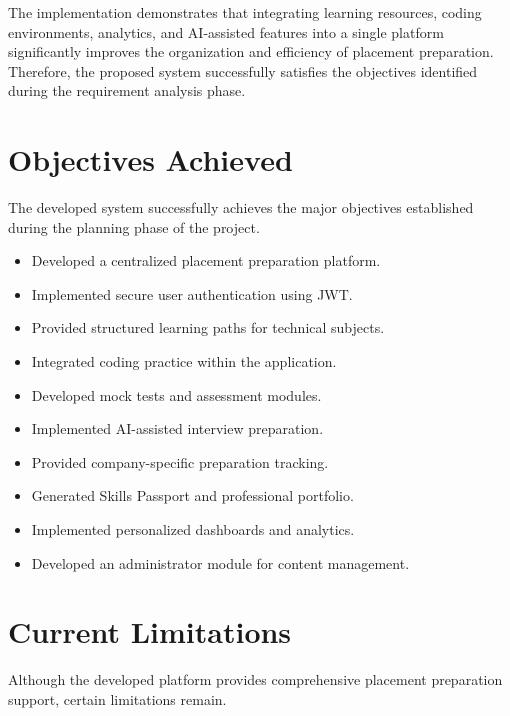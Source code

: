 The implementation demonstrates that integrating learning resources, coding environments, analytics, and AI-assisted features into a single platform significantly improves the organization and efficiency of placement preparation. Therefore, the proposed system successfully satisfies the objectives identified during the requirement analysis phase.

\section{Objectives Achieved}

The developed system successfully achieves the major objectives established during the planning phase of the project.

\begin{itemize}

\item Developed a centralized placement preparation platform.

\item Implemented secure user authentication using JWT.

\item Provided structured learning paths for technical subjects.

\item Integrated coding practice within the application.

\item Developed mock tests and assessment modules.

\item Implemented AI-assisted interview preparation.

\item Provided company-specific preparation tracking.

\item Generated Skills Passport and professional portfolio.

\item Implemented personalized dashboards and analytics.

\item Developed an administrator module for content management.

\end{itemize}

\section{Current Limitations}

Although the developed platform provides comprehensive placement preparation support, certain limitations remain.

